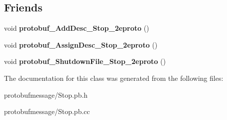 \subsection*{Friends}
\begin{DoxyCompactItemize}
\item 
\hypertarget{class_close_a0c39e7d18f2c161aa57a4cc4b9e6ec8f}{void {\bfseries protobuf\-\_\-\-Add\-Desc\-\_\-\-Stop\-\_\-2eproto} ()}\label{class_close_a0c39e7d18f2c161aa57a4cc4b9e6ec8f}

\item 
\hypertarget{class_close_aa2b2a8c14ba7de4972609cfba873a048}{void {\bfseries protobuf\-\_\-\-Assign\-Desc\-\_\-\-Stop\-\_\-2eproto} ()}\label{class_close_aa2b2a8c14ba7de4972609cfba873a048}

\item 
\hypertarget{class_close_a286f43855e53704e855ebc2fcc228c04}{void {\bfseries protobuf\-\_\-\-Shutdown\-File\-\_\-\-Stop\-\_\-2eproto} ()}\label{class_close_a286f43855e53704e855ebc2fcc228c04}

\end{DoxyCompactItemize}


The documentation for this class was generated from the following files\-:\begin{DoxyCompactItemize}
\item 
protobufmessage/Stop.\-pb.\-h\item 
protobufmessage/Stop.\-pb.\-cc\end{DoxyCompactItemize}
